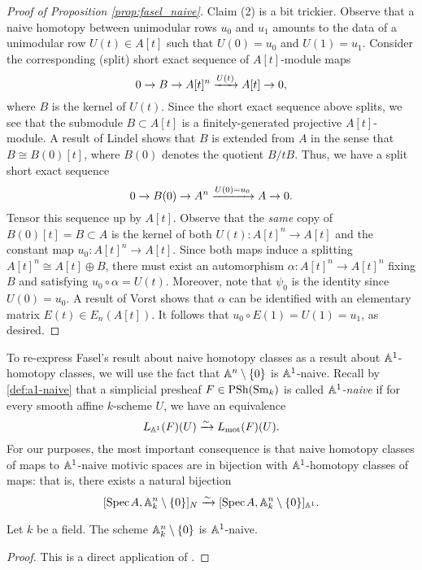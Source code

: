 \begin{proof}[Proof of Proposition \ref{prop:fasel_naive}]
    Claim (2) is a bit trickier. Observe that a naive homotopy between unimodular rows $u_0$ and $u_1$ amounts to the data of a unimodular row $U(t) \in A[t]$ such that $U(0) = u_0$ and $U(1) = u_1$. Consider the corresponding (split) short exact sequence of $A[t]$-module maps
    \[
    0 \to B \to A[t]^n \xrightarrow{U(t)} A[t] \to 0,
    \]
    where $B$ is the kernel of $U(t)$. Since the short exact sequence above splits, we see that the submodule $B \subset A[t]$ is a finitely-generated projective $A[t]$-module. A result of Lindel \cite[Lemma 3]{Lindel} shows that $B$ is extended from $A$ in the sense that $B \cong B(0)[t]$, where $B(0)$ denotes the quotient $B/tB$. Thus, we have a split short exact sequence
    \[
    0 \to B(0) \to A^n \xrightarrow{U(0) = u_0} A \to 0.
    \]
    Tensor this sequence up by $A[t]$. Observe that the \textit{same} copy of $B(0)[t] = B \subset A$ is the kernel of both $U(t)\colon A[t]^n \to A[t]$ and the constant map $u_0\colon A[t]^n \to A[t]$. Since both maps induce a splitting $A[t]^n \cong A[t] \oplus B$, there must exist an automorphism $\alpha\colon A[t]^n \to A[t]^n$ fixing $B$ and satisfying $u_0 \circ \alpha = U(t)$. Moreover, note that $\psi_0$ is the identity since $U(0) = u_0$. A result of Vorst \cite{Vorst} shows that $\alpha$ can be identified with an elementary matrix $E(t) \in E_n(A[t])$. It follows that $u_0 \circ E(1) = U(1) = u_1$, as desired.
\end{proof}

To re-express Fasel's result about naive homotopy classes as a result about $\mathbb{A}^1$-homotopy classes, we will use the fact that $\mathbb{A}^n \setminus \{0\}$ is $\mathbb{A}^1$-naive. Recall by \autoref{def:a1-naive} that a simplicial presheaf $F \in \mathrm{PSh}(\mathrm{Sm}_k)$ is called \textit{$\mathbb{A}^1$-naive} if for every smooth affine $k$-scheme $U$, we have an equivalence
\[
L_{\mathbb{A}^1}(F)(U) \xrightarrow{\sim} L_{\operatorname{mot}}(F)(U).
\]
For our purposes, the most important consequence is that naive homotopy classes of maps to $\mathbb{A}^1$-naive motivic spaces are in bijection with $\mathbb{A}^1$-homotopy classes of maps: that is, there exists a natural bijection
\[
[\text{Spec}\hspace{0.1em} A, \mathbb{A}^n_k\setminus \{0\}]_{N} \xrightarrow{\sim} [\text{Spec}\hspace{0.1em} A, \mathbb{A}^n_k\setminus \{0\}]_{\mathbb{A}^1}.
\]

\begin{lemma}
    Let $k$ be a field. The scheme $\mathbb{A}^n_k \setminus \{0\}$ is $\mathbb{A}^1$-naive.
\end{lemma}

\begin{proof}
    This is a direct application of \cite[Corollary 4.2.6]{AHW2}.
\end{proof}

